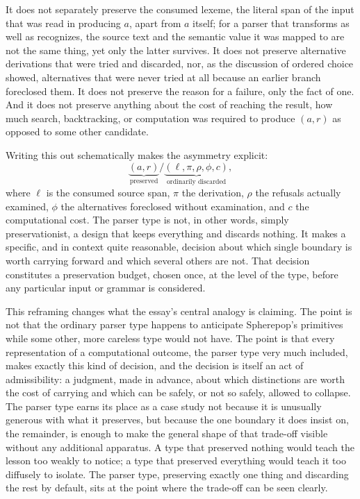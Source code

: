 \documentclass[11pt]{article}
\begin{document}
It does not separately preserve the consumed lexeme, the literal span of the input that was read in producing $a$, apart from $a$ itself; for a parser that transforms as well as recognizes, the source text and the semantic value it was mapped to are not the same thing, yet only the latter survives. It does not preserve alternative derivations that were tried and discarded, nor, as the discussion of ordered choice showed, alternatives that were never tried at all because an earlier branch foreclosed them. It does not preserve the reason for a failure, only the fact of one. And it does not preserve anything about the cost of reaching the result, how much search, backtracking, or computation was required to produce $(a, r)$ as opposed to some other candidate.

Writing this out schematically makes the asymmetry explicit:
\[
\underbrace{(a, r)}_{\text{preserved}} \Big/ \underbrace{(\ell, \pi, \rho, \phi, c)}_{\text{ordinarily discarded}},
\]
where $\ell$ is the consumed source span, $\pi$ the derivation, $\rho$ the refusals actually examined, $\phi$ the alternatives foreclosed without examination, and $c$ the computational cost. The parser type is not, in other words, simply preservationist, a design that keeps everything and discards nothing. It makes a specific, and in context quite reasonable, decision about which single boundary is worth carrying forward and which several others are not. That decision constitutes a preservation budget, chosen once, at the level of the type, before any particular input or grammar is considered.

This reframing changes what the essay's central analogy is claiming. The point is not that the ordinary parser type happens to anticipate Spherepop's primitives while some other, more careless type would not have. The point is that every representation of a computational outcome, the parser type very much included, makes exactly this kind of decision, and the decision is itself an act of admissibility: a judgment, made in advance, about which distinctions are worth the cost of carrying and which can be safely, or not so safely, allowed to collapse. The parser type earns its place as a case study not because it is unusually generous with what it preserves, but because the one boundary it does insist on, the remainder, is enough to make the general shape of that trade-off visible without any additional apparatus. A type that preserved nothing would teach the lesson too weakly to notice; a type that preserved everything would teach it too diffusely to isolate. The parser type, preserving exactly one thing and discarding the rest by default, sits at the point where the trade-off can be seen clearly.
\end{document}
